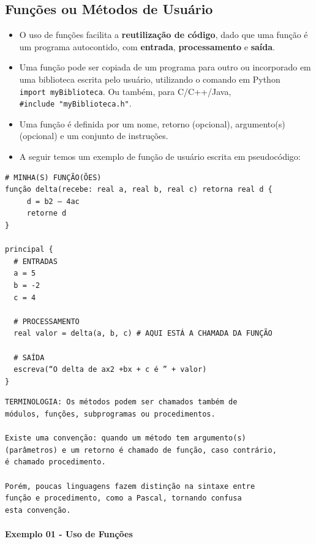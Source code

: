 \documentclass[12pt,a4paper]{article}
\begin{document}
    \hypertarget{funuxe7uxf5es-ou-muxe9todos-de-usuuxe1rio}{%
\subsection{Funções ou Métodos de
Usuário}\label{funuxe7uxf5es-ou-muxe9todos-de-usuuxe1rio}}

    \begin{itemize}
\item
  O uso de funções facilita a \textbf{reutilização de código}, dado que
  uma função é um programa autocontido, com \textbf{entrada},
  \textbf{processamento} e \textbf{saída}.
\item
  Uma função pode ser copiada de um programa para outro ou incorporado
  em uma biblioteca escrita pelo usuário, utilizando o comando em Python
  \texttt{import\ myBiblioteca}. Ou também, para C/C++/Java,
  \texttt{\#include\ "myBiblioteca.h"}.
\item
  Uma função é definida por um nome, retorno (opcional), argumento(s)
  (opcional) e um conjunto de instruções.
\item
  A seguir temos um exemplo de função de usuário escrita em
  pseudocódigo:
\end{itemize}

    \begin{verbatim}
# MINHA(S) FUNÇÃO(ÕES)
função delta(recebe: real a, real b, real c) retorna real d {
     d = b2 – 4ac
     retorne d
}

principal {
  # ENTRADAS
  a = 5
  b = -2
  c = 4

  # PROCESSAMENTO
  real valor = delta(a, b, c) # AQUI ESTÁ A CHAMADA DA FUNÇÃO
  
  # SAÍDA
  escreva(“O delta de ax2 +bx + c é ” + valor)
}
\end{verbatim}

    \begin{verbatim}
TERMINOLOGIA: Os métodos podem ser chamados também de 
módulos, funções, subprogramas ou procedimentos. 

Existe uma convenção: quando um método tem argumento(s) 
(parâmetros) e um retorno é chamado de função, caso contrário, 
é chamado procedimento. 

Porém, poucas linguagens fazem distinção na sintaxe entre 
função e procedimento, como a Pascal, tornando confusa 
esta convenção. 
\end{verbatim}

    \hypertarget{exemplo-01---uso-de-funuxe7uxf5es}{%
\paragraph{Exemplo 01 - Uso de
Funções}\label{exemplo-01---uso-de-funuxe7uxf5es}}
\end{document}
